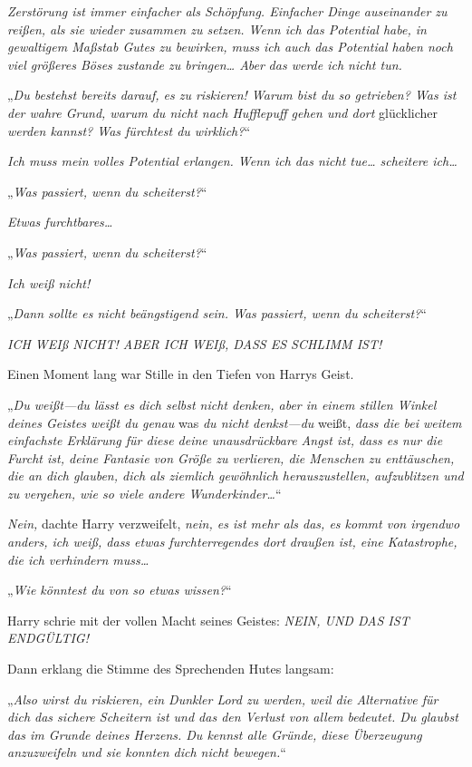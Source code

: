 {\emph{Zerstörung ist immer einfacher als Schöpfung. Einfacher Dinge auseinander zu reißen, als sie wieder zusammen zu setzen. Wenn ich das Potential habe, in gewaltigem Maßstab Gutes zu bewirken, muss ich auch das Potential haben noch viel größeres Böses zustande zu bringen… Aber} \emph{das werde ich nicht tun.}

„\emph{Du bestehst bereits darauf, es zu riskieren! Warum bist du so getrieben? Was ist der wahre Grund, warum du nicht nach Hufflepuff gehen und dort} glücklicher \emph{werden kannst? Was fürchtest du wirklich?}“

\emph{Ich muss mein volles Potential erlangen. Wenn ich das nicht tue… scheitere ich…}

„\emph{Was passiert, wenn du scheiterst?}“

\emph{Etwas furchtbares…}

„\emph{Was passiert, wenn du scheiterst?}“

\emph{Ich weiß nicht!}

„\emph{Dann sollte es nicht beängstigend sein. Was passiert, wenn du scheiterst?}“

\emph{ICH WEIß NICHT! ABER ICH WEIß, DASS ES SCHLIMM IST!}

Einen Moment lang war Stille in den Tiefen von Harrys Geist.

„\emph{Du weißt—du lässt es dich selbst nicht denken, aber in einem stillen Winkel deines Geistes weißt du genau} was \emph{du nicht denkst—du} weißt, \emph{dass die bei weitem einfachste Erklärung für diese deine unausdrückbare Angst ist, dass es nur die Furcht ist, deine Fantasie von Größe zu verlieren, die Menschen zu enttäuschen, die an dich glauben, dich als ziemlich gewöhnlich herauszustellen, aufzublitzen und zu vergehen, wie so viele andere Wunderkinder…}“

\emph{Nein,} dachte Harry verzweifelt, \emph{nein, es ist mehr als das, es kommt von irgendwo anders, ich weiß, dass etwas furchterregendes dort draußen ist, eine Katastrophe, die ich verhindern muss…}

„\emph{Wie könntest du von so etwas wissen?}“

Harry schrie mit der vollen Macht seines Geistes: \emph{NEIN, UND DAS IST ENDGÜLTIG!}

Dann erklang die Stimme des Sprechenden Hutes langsam:

„\emph{Also wirst du riskieren, ein Dunkler Lord zu werden, weil die Alternative für dich das sichere Scheitern ist und das den Verlust von allem bedeutet. Du glaubst das im Grunde deines Herzens. Du kennst alle Gründe, diese Überzeugung anzuzweifeln und sie konnten dich nicht bewegen.}“

}
